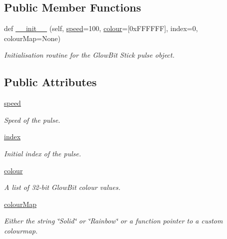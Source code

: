\subsection*{Public Member Functions}
\begin{DoxyCompactItemize}
\item 
def \hyperlink{classglowbit_1_1stick_1_1pulse_a53a1dbcea6d84002f76f9c10c7ae0481}{\+\_\+\+\_\+init\+\_\+\+\_\+} (self, \hyperlink{classglowbit_1_1stick_1_1pulse_ac600e5460c9f05e36ea6d7b7cef0c763}{speed}=100, \hyperlink{classglowbit_1_1stick_1_1pulse_a1b0b4b29bc1a9bbd90d9f919589a560a}{colour}=\mbox{[}0x\+F\+F\+F\+F\+F\+F\mbox{]}, index=0, colour\+Map=\+None)
\begin{DoxyCompactList}\small\item\em Initialisation routine for the Glow\+Bit Stick pulse object. \end{DoxyCompactList}\end{DoxyCompactItemize}
\subsection*{Public Attributes}
\begin{DoxyCompactItemize}
\item 
\mbox{\label{classglowbit_1_1stick_1_1pulse_ac600e5460c9f05e36ea6d7b7cef0c763}} 
\hyperlink{classglowbit_1_1stick_1_1pulse_ac600e5460c9f05e36ea6d7b7cef0c763}{speed}
\begin{DoxyCompactList}\small\item\em Speed of the pulse. \end{DoxyCompactList}\item 
\mbox{\label{classglowbit_1_1stick_1_1pulse_a7b5b6ddb2b400a838fbd8ec7819a4639}} 
\hyperlink{classglowbit_1_1stick_1_1pulse_a7b5b6ddb2b400a838fbd8ec7819a4639}{index}
\begin{DoxyCompactList}\small\item\em Initial index of the pulse. \end{DoxyCompactList}\item 
\hyperlink{classglowbit_1_1stick_1_1pulse_a1b0b4b29bc1a9bbd90d9f919589a560a}{colour}
\begin{DoxyCompactList}\small\item\em A list of 32-\/bit Glow\+Bit colour values. \end{DoxyCompactList}\item 
\hyperlink{classglowbit_1_1stick_1_1pulse_a11a715a74934bb938e8e826da29aac67}{colour\+Map}
\begin{DoxyCompactList}\small\item\em Either the string \char`\"{}\+Solid\char`\"{} or \char`\"{}\+Rainbow\char`\"{} or a function pointer to a custom colourmap. \end{DoxyCompactList}\end{DoxyCompactItemize}


